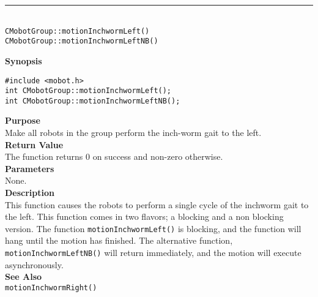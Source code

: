 \noindent
\vspace{5pt}
\rule{4.5in}{0.015in}\\
\noindent
{\LARGE \texttt{CMobotGroup::motionInchwormLeft()}}\\
{\LARGE \texttt{CMobotGroup::motionInchwormLeftNB()}}\\
{}

\noindent
{\bf Synopsis}\\
\begin{verbatim}
#include <mobot.h>
int CMobotGroup::motionInchwormLeft();
int CMobotGroup::motionInchwormLeftNB();
\end{verbatim}

\noindent
{\bf Purpose}\\
Make all robots in the group perform the inch-worm gait to the left.\\

\noindent
{\bf Return Value}\\
The function returns 0 on success and non-zero otherwise.\\

\noindent
{\bf Parameters}\\
None.\\

\noindent
{\bf Description}\\
This function causes the robots to perform a single cycle of the inchworm gait
to the left. This function comes in two flavors; a blocking and a non blocking
version. The function \texttt{motionInchwormLeft()} is blocking, and the function
will hang until the motion has finished. The alternative function, \texttt{motionInchwormLeftNB()} 
will return immediately, and the motion will execute asynchronously. \\

\noindent
{\bf See Also}\\
\texttt{motionInchwormRight()}

